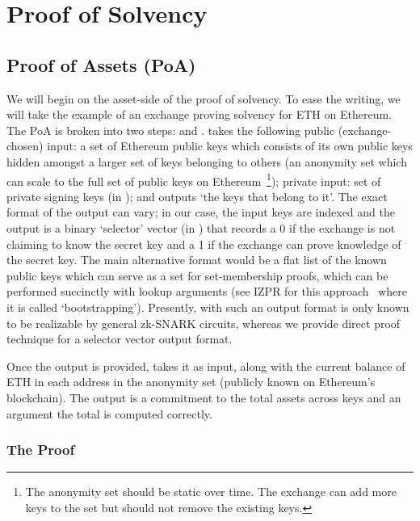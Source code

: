\chapter{Proof of Solvency}

\section{Proof of Assets (PoA)}

We will begin on the asset-side of the proof of solvency. To ease the writing, we will take the example of an exchange proving solvency for ETH on Ethereum. The PoA is broken into two steps: \bootstrap and \poa. \bootstrap takes the following public (exchange-chosen) input: a set of Ethereum public keys which consists of its own public keys hidden amongst a larger set of keys belonging to others (\ie an anonymity set which can scale to the full set of public keys on Ethereum~\footnote{The anonymity set should be static over time. The exchange can add more keys to the set but should not remove the existing keys.}); private input: set of private signing keys (in \secp); and outputs `the keys that belong to it'. The exact format of the output can vary; in our case, the input keys are indexed and the output is a binary `selector' vector (in \bls) that records a 0 if the exchange is not claiming to know the secret key and a 1 if the exchange can prove knowledge of the secret key. The main alternative format would be a flat list of the known public keys which can serve as a set for set-membership proofs, which can be performed succinctly with lookup arguments (see IZPR for this approach~\cite{izpr} where it is called `bootstrapping'). Presently, \bootstrap with such an output format is only known to be realizable by general zk-SNARK circuits, whereas we provide direct proof technique for a selector vector output format.

Once the \bootstrap output is provided, \poa takes it as input, along with the current balance of ETH in each address in the anonymity set (publicly known on Ethereum's blockchain). The output is a commitment to the total assets across keys and an argument the total is computed correctly. 


\subsection{The \bootstrap Proof}

